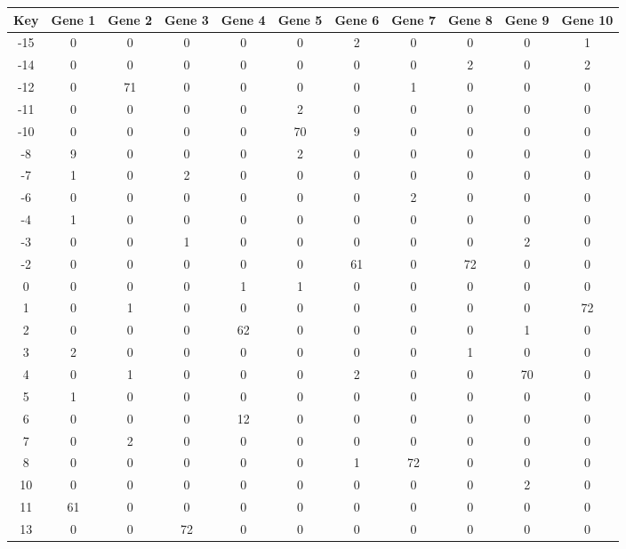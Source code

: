 \begin{tabular}{|c|c|c|c|c|c|c|c|c|c|c|}
\hline
Key & Gene 1 & Gene 2 & Gene 3 & Gene 4 & Gene 5 & Gene 6 & Gene 7 & Gene 8 & Gene 9 & Gene 10 \\
\hline
-15 & 0 & 0 & 0 & 0 & 0 & 2 & 0 & 0 & 0 & 1 \\
-14 & 0 & 0 & 0 & 0 & 0 & 0 & 0 & 2 & 0 & 2 \\
-12 & 0 & 71 & 0 & 0 & 0 & 0 & 1 & 0 & 0 & 0 \\
-11 & 0 & 0 & 0 & 0 & 2 & 0 & 0 & 0 & 0 & 0 \\
-10 & 0 & 0 & 0 & 0 & 70 & 9 & 0 & 0 & 0 & 0 \\
-8 & 9 & 0 & 0 & 0 & 2 & 0 & 0 & 0 & 0 & 0 \\
-7 & 1 & 0 & 2 & 0 & 0 & 0 & 0 & 0 & 0 & 0 \\
-6 & 0 & 0 & 0 & 0 & 0 & 0 & 2 & 0 & 0 & 0 \\
-4 & 1 & 0 & 0 & 0 & 0 & 0 & 0 & 0 & 0 & 0 \\
-3 & 0 & 0 & 1 & 0 & 0 & 0 & 0 & 0 & 2 & 0 \\
-2 & 0 & 0 & 0 & 0 & 0 & 61 & 0 & 72 & 0 & 0 \\
0 & 0 & 0 & 0 & 1 & 1 & 0 & 0 & 0 & 0 & 0 \\
1 & 0 & 1 & 0 & 0 & 0 & 0 & 0 & 0 & 0 & 72 \\
2 & 0 & 0 & 0 & 62 & 0 & 0 & 0 & 0 & 1 & 0 \\
3 & 2 & 0 & 0 & 0 & 0 & 0 & 0 & 1 & 0 & 0 \\
4 & 0 & 1 & 0 & 0 & 0 & 2 & 0 & 0 & 70 & 0 \\
5 & 1 & 0 & 0 & 0 & 0 & 0 & 0 & 0 & 0 & 0 \\
6 & 0 & 0 & 0 & 12 & 0 & 0 & 0 & 0 & 0 & 0 \\
7 & 0 & 2 & 0 & 0 & 0 & 0 & 0 & 0 & 0 & 0 \\
8 & 0 & 0 & 0 & 0 & 0 & 1 & 72 & 0 & 0 & 0 \\
10 & 0 & 0 & 0 & 0 & 0 & 0 & 0 & 0 & 2 & 0 \\
11 & 61 & 0 & 0 & 0 & 0 & 0 & 0 & 0 & 0 & 0 \\
13 & 0 & 0 & 72 & 0 & 0 & 0 & 0 & 0 & 0 & 0 \\
\hline
\end{tabular}